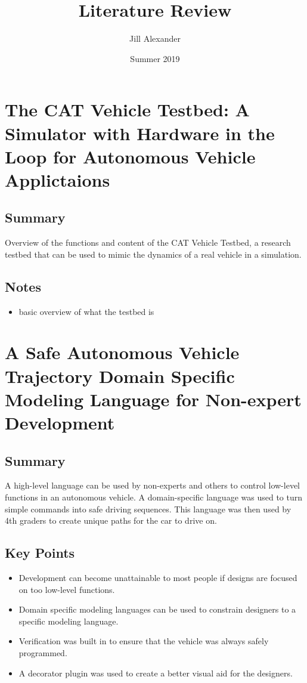 \documentclass{article}
\title{Literature Review}
\date{Summer 2019}
\author{Jill Alexander}
\begin{document}
\maketitle
\newpage

\section{The CAT Vehicle Testbed: A Simulator with Hardware in the Loop for Autonomous Vehicle Applictaions}
	\subsection{Summary}
	Overview of the functions and content of the CAT Vehicle Testbed, a research testbed that can be used to mimic the dynamics of a real vehicle in a simulation.
	\subsection{Notes}
	\begin{itemize}
	\item basic overview of what the testbed is
	\end{itemize}
	\newpage
	

\section{A Safe Autonomous Vehicle Trajectory Domain Specific Modeling Language for Non-expert Development}
	\subsection{Summary}
	A high-level language can be used by non-experts and others to control low-level functions in an autonomous vehicle. A domain-specific language was used to turn simple commands into safe driving sequences. This language was then used by 4th graders to create unique paths for the car to drive on.
	\subsection{Key Points}
	\begin{itemize}
	\item Development can become unattainable to most people if designs are focused on too low-level functions.
	\item Domain specific modeling languages can be used to constrain designers to a specific modeling language.
	\item Verification was built in to ensure that the vehicle was always safely programmed.
	\item A decorator plugin was used to create a better visual aid for the designers.
	\end{itemize}
\end{document}
